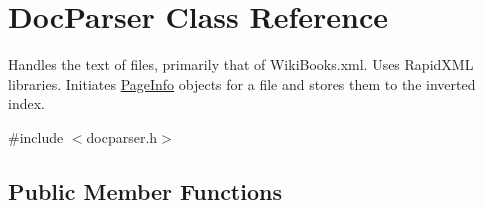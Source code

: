 \hypertarget{class_doc_parser}{}\section{Doc\+Parser Class Reference}
\label{class_doc_parser}


Handles the text of files, primarily that of Wiki\+Books.\+xml. Uses Rapid\+X\+M\+L libraries. Initiates \hyperlink{class_page_info}{Page\+Info} objects for a file and stores them to the inverted index.  




{\ttfamily \#include $<$docparser.\+h$>$}

\subsection*{Public Member Functions}
